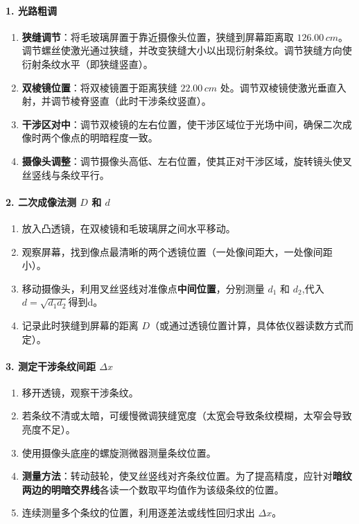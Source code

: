 \documentclass[]{../template/Report}%
\begin{document}
\paragraph{1. 光路粗调}
\begin{enumerate}
    \item \textbf{狭缝调节}：将毛玻璃屏置于靠近摄像头位置，狭缝到屏幕距离取 $126.00\,cm$。调节螺丝使激光通过狭缝，并改变狭缝大小以出现衍射条纹。调节狭缝方向使衍射条纹水平（即狭缝竖直）。
    \item \textbf{双棱镜位置}：将双棱镜置于距离狭缝 $22.00\,cm$ 处。调节双棱镜使激光垂直入射，并调节棱脊竖直（此时干涉条纹竖直）。
    \item \textbf{干涉区对中}：调节双棱镜的左右位置，使干涉区域位于光场中间，确保二次成像时两个像点的明暗程度一致。
    \item \textbf{摄像头调整}：调节摄像头高低、左右位置，使其正对干涉区域，旋转镜头使叉丝竖线与条纹平行。
\end{enumerate}


\paragraph{2. 二次成像法测 $D$ 和 $d$}
\begin{enumerate}
    \item 放入凸透镜，在双棱镜和毛玻璃屏之间水平移动。
    \item 观察屏幕，找到像点最清晰的两个透镜位置（一处像间距大，一处像间距小）。
    \item 移动摄像头，利用叉丝竖线对准像点\textbf{中间位置}，分别测量 $d_1$ 和 $d_2$,代入$d=\sqrt{d_1 d_2}$得到d。
    \item 记录此时狭缝到屏幕的距离 $D$（或通过透镜位置计算，具体依仪器读数方式而定）。
\end{enumerate}



\paragraph{3. 测定干涉条纹间距 $\Delta x$}
\begin{enumerate}
    \item 移开透镜，观察干涉条纹。
    \item 若条纹不清或太暗，可缓慢微调狭缝宽度（太宽会导致条纹模糊，太窄会导致亮度不足）。
    \item 使用摄像头底座的螺旋测微器测量条纹位置。
    \item \textbf{测量方法}：转动鼓轮，使叉丝竖线对齐条纹位置。为了提高精度，应针对\textbf{暗纹两边的明暗交界线}各读一个数取平均值作为该级条纹的位置。
    \item 连续测量多个条纹的位置，利用逐差法或线性回归求出 $\Delta x$。
\end{enumerate}
\end{document}
